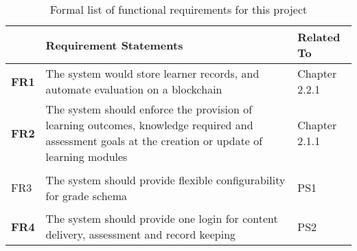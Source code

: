 \begin{table}[!h] 
    \caption{Formal list of functional requirements for this project}
    \centering
    \label{table:formal-reqs}
    \begin{tabularx}{\textwidth}{>{\bfseries}lXl}
        & Requirement Statements & Related To\\
        \toprule
        FR1 & The system would store learner records, and automate evaluation on a blockchain 
        & Chapter 2.2.1\\\midrule
        FR2 & The system should enforce the provision of learning outcomes, knowledge required 
        and assessment goals at the creation or update of learning modules & Chapter 2.1.1\\\midrule
        
        FR3 & The system should provide flexible configurability for grade schema & PS1\\\midrule
        FR4 & The system should provide one login for content delivery, 
        assessment and record keeping & PS2\\\bottomrule
    \end{tabularx}
\end{table}